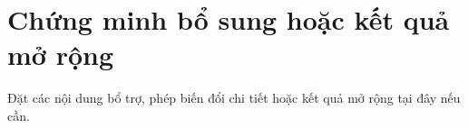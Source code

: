 \section{Chứng minh bổ sung hoặc kết quả mở rộng}
Đặt các nội dung bổ trợ, phép biến đổi chi tiết hoặc kết quả mở rộng tại đây
nếu cần.
